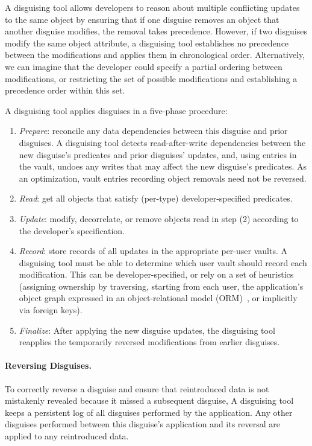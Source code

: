 A disguising tool allows developers to reason about multiple conflicting updates to the same object by ensuring that
if one disguise removes an object that another disguise modifies, the removal takes
precedence.
%
However, if two disguises modify the same object attribute, a disguising tool
establishes no precedence between the modifications and applies them in chronological order.
Alternatively, we can imagine that the developer could specify a partial ordering between
modifications, or restricting the set of possible modifications and establishing a precedence order
within this set.

A disguising tool applies disguises in a five-phase procedure:
\begin{enumerate}[nosep]
    \item \emph{Prepare}: reconcile any data dependencies between this disguise and prior disguises.
            A disguising tool detects read-after-write dependencies between the new disguise's predicates and prior disguises'
            updates, and, using entries in the vault, undoes any writes that may affect the new disguise's predicates. As an
            optimization, vault entries recording object removals need not be reversed.
        \item \emph{Read}: get all objects that satisfy (per-type) developer-specified predicates.
        \item \emph{Update}: modify, decorrelate, or remove objects read in step (2) according to the
        developer's specification.
    \item \emph{Record}: store records of all updates in the appropriate per-user vaults. A
        disguising tool
        must be able to determine which user vault should record each modification. This can be
        developer-specified, or rely on a set of heuristics (\eg assigning ownership by traversing,
        starting from each user, the application's object graph expressed in an object-relational
        model (ORM)~\cite{orm}, or implicitly via foreign keys).
        \item \emph{Finalize}: After applying the new disguise updates, the disguising tool reapplies the temporarily reversed modifications from earlier disguises.
\end{enumerate}

\paragraph{Reversing Disguises.}
To correctly reverse a disguise and ensure that reintroduced data is not mistakenly revealed because
it missed a subsequent disguise, A disguising tool keeps a persistent log of all disguises performed by the
application. Any other disguises performed between this disguise's application and its reversal are 
applied to any reintroduced data.
